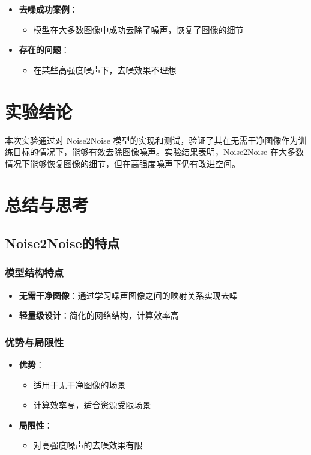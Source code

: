 \documentclass[UTF8]{ctexart}
\begin{document}
\begin{itemize}
    \item \textbf{去噪成功案例}：
    \begin{itemize}
        \item 模型在大多数图像中成功去除了噪声，恢复了图像的细节
    \end{itemize}
    
    \item \textbf{存在的问题}：
    \begin{itemize}
        \item 在某些高强度噪声下，去噪效果不理想
    \end{itemize}
\end{itemize}

\section{实验结论}

本次实验通过对 Noise2Noise 模型的实现和测试，验证了其在无需干净图像作为训练目标的情况下，能够有效去除图像噪声。实验结果表明，Noise2Noise 在大多数情况下能够恢复图像的细节，但在高强度噪声下仍有改进空间。

\section{总结与思考}

\subsection{Noise2Noise的特点}

\subsubsection{模型结构特点}
\begin{itemize}
    \item \textbf{无需干净图像}：通过学习噪声图像之间的映射关系实现去噪
    \item \textbf{轻量级设计}：简化的网络结构，计算效率高
\end{itemize}

\subsubsection{优势与局限性}
\begin{itemize}
    \item \textbf{优势}：
    \begin{itemize}
        \item 适用于无干净图像的场景
        \item 计算效率高，适合资源受限场景
    \end{itemize}
    
    \item \textbf{局限性}：
    \begin{itemize}
        \item 对高强度噪声的去噪效果有限
    \end{itemize}
\end{itemize}
\end{document}
